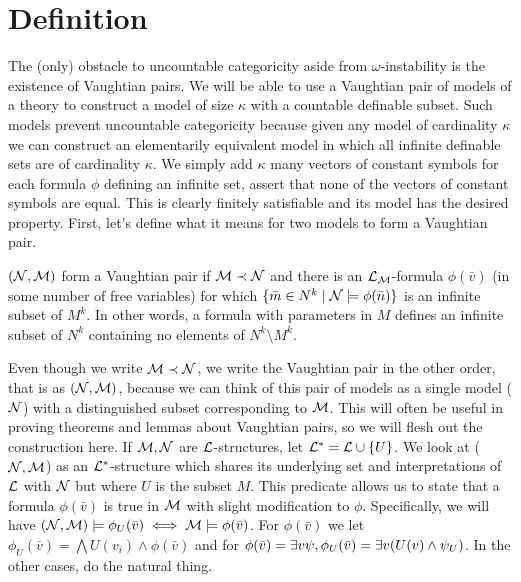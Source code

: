 \section{Definition}
The (only) obstacle to uncountable categoricity aside from \(\omega\)-instability is the existence of Vaughtian pairs. %
We will be able to use a Vaughtian pair of models of a theory to construct a model of size \(\kappa\) with a countable definable subset.  
Such models prevent uncountable categoricity because given any model of cardinality \(\kappa\) we can construct an elementarily equivalent model in which all infinite definable sets are of cardinality \(\kappa\).
We simply add \(\kappa\) many vectors of constant symbols for each formula \(\phi\) defining an infinite set, assert that none of the vectors of constant symbols are equal. This is clearly finitely satisfiable and its model has the desired property.
First, let's define what it means for two models to form a Vaughtian pair. %

\begin{definition}\label{definition_vaughtian_pairs}
\((\mathcal{N}, \mathcal{M})\) form a Vaughtian pair if \(\mathcal{M} \prec \mathcal{N}\) and there is an \(\mathcal{L}_{\mathcal{M}}\)-formula \(\phi(\bar{v})\) (in some number of free variables) for which
\(\{\bar{m} \in N^k \mid \mathcal{N} \models \phi(\bar{n})\}\) is an infinite subset of \(M^k\). %
In other words, a formula with parameters in \(M\) defines an infinite subset of \(N^k\) containing no elements of \(N^k \setminus M^k\).
\end{definition}

Even though we write \(\mathcal{M} \prec \mathcal{N}\), we write the Vaughtian pair in the other order, that is as \((\mathcal{N}, \mathcal{M})\), because we can think of this pair of models as a single model (\(\mathcal{N}\)) with a distinguished subset corresponding to \(\mathcal{M}\).
This will often be useful in proving theorems and lemmas about Vaughtian pairs, so we will flesh out the construction here. 
If \(\mathcal{M}, \mathcal{N}\) are \(\mathcal{L}\)-structures, let  \(\mathcal{L}^* = \mathcal{L} \cup \{U\}\). 
We look at (\(\mathcal{N}, \mathcal{M}\)) as an \(\mathcal{L}^*\)-structure which shares its underlying set and interpretations of \(\mathcal{L}\) with \(\mathcal{N}\) but where \(U\) is the subset \(M\). 
This predicate allows us to state that a formula \(\phi(\bar{v})\) is true in \(\mathcal{M}\) with slight modification to \(\phi\).
Specifically, we will have \((\mathcal{N}, \mathcal{M}) \models \phi_U(\bar{v}) \iff \mathcal{M} \models \phi(\bar{v})\).
For \(\phi(\bar{v})\) \qf we let \(\phi_U(\bar{v}) = \bigwedge U(v_i) \land \phi(\bar{v})\) and for \(\phi(\bar{v}) = \exists v \psi, \phi_U(\bar{v}) = \exists v (U(v) \land \psi_U)\). 
In the other cases, do the natural thing. %

